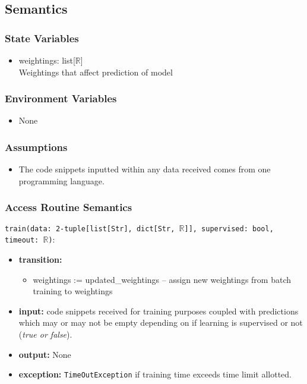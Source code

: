 \documentclass[12pt, titlepage]{article}
\begin{document}
\subsection{Semantics}

\subsubsection{State Variables}

\begin{itemize}
    \item weightings: list[$\mathbb{R}$] \\
    Weightings that affect prediction of model
\end{itemize}

\subsubsection{Environment Variables}

\begin{itemize}
  \item None
\end{itemize}

\subsubsection{Assumptions}

\begin{itemize}
    \item The code snippets inputted within any data received comes from one programming language.
\end{itemize}
\subsubsection{Access Routine Semantics}

\noindent \texttt{train(data: 2-tuple[list[Str], dict[Str, $\mathbb{R}$]], supervised: bool, timeout: $\mathbb{R}$)}:
\begin{itemize}
    \item \textbf{transition:} 
    \begin{itemize}
        \item weightings := updated\_weightings -- assign new weightings from batch training to weightings
    \end{itemize}
    \item \textbf{input:} code snippets received for training purposes coupled with predictions which may or may not be empty depending on if learning is supervised or not (\textit{true or false}).
    \item \textbf{output:} None
    \item \textbf{exception:} \texttt{TimeOutException} if training time exceeds time limit allotted. 
\end{itemize}
\end{document}
